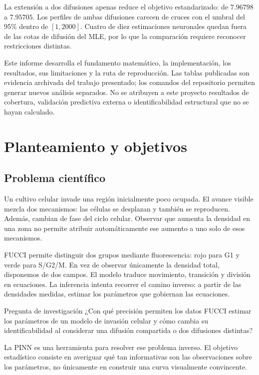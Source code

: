 \documentclass[11pt,a4paper]{report}
\begin{document}
La extensión a dos difusiones apenas reduce el objetivo estandarizado: de $7.96798$ a $7.95705$. Los perfiles de ambas difusiones carecen de cruces con el umbral del 95\% dentro de $[1,2000]$. Cuatro de diez estimaciones neuronales quedan fuera de las cotas de difusión del MLE, por lo que la comparación requiere reconocer restricciones distintas.

Este informe desarrolla el fundamento matemático, la implementación, los resultados, sus limitaciones y la ruta de reproducción. Las tablas publicadas son evidencia archivada del trabajo presentado; los comandos del repositorio permiten generar nuevos análisis separados. No se atribuyen a este proyecto resultados de cobertura, validación predictiva externa o identificabilidad estructural que no se hayan calculado.
\chapter{Planteamiento y objetivos}
\section{Problema científico}
Un cultivo celular invade una región inicialmente poco ocupada. El avance visible mezcla dos mecanismos: las células se desplazan y también se reproducen. Además, cambian de fase del ciclo celular. Observar que aumenta la densidad en una zona no permite atribuir automáticamente ese aumento a uno solo de esos mecanismos.

FUCCI permite distinguir dos grupos mediante fluorescencia: rojo para G1 y verde para S/G2/M. En vez de observar únicamente la densidad total, disponemos de dos campos. El modelo traduce movimiento, transición y división en ecuaciones. La inferencia intenta recorrer el camino inverso: a partir de las densidades medidas, estimar los parámetros que gobiernan las ecuaciones.

\begin{idea}{Pregunta de investigación}
¿Con qué precisión permiten los datos FUCCI estimar los parámetros de un modelo de invasión celular y cómo cambia su identificabilidad al considerar una difusión compartida o dos difusiones distintas?
\end{idea}

La PINN es una herramienta para resolver ese problema inverso. El objetivo estadístico consiste en averiguar qué tan informativas son las observaciones sobre los parámetros, no únicamente en construir una curva visualmente convincente.
\end{document}
